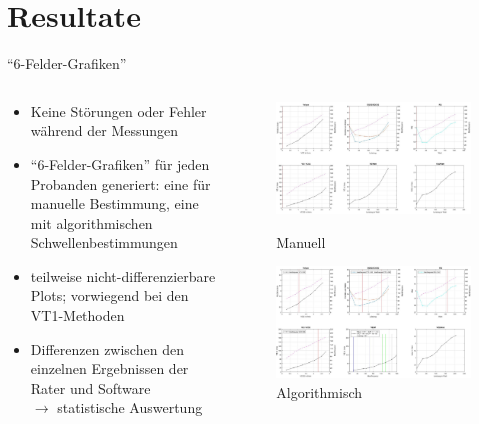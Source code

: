 \documentclass[colorBG,slideColor,8pt]{beamer}
\begin{document}
\section{Resultate}
\begin{frame}
\tableofcontents[currentsection]
\end{frame}

\begin{frame}{"`6-Felder-Grafiken"'}
\begin{columns}
	\begin{column}{0.5\linewidth}
		\begin{itemize}
			\item Keine Störungen oder Fehler während der Messungen
			\item "`6-Felder-Grafiken"' für jeden Probanden generiert: eine für manuelle Bestimmung, eine mit algorithmischen Schwellenbestimmungen
			\item teilweise nicht-differenzierbare Plots; vorwiegend bei den VT1-Methoden
			\item Differenzen zwischen den einzelnen Ergebnissen der Rater und Software\\$\rightarrow$ statistische Auswertung
		\end{itemize}
	\end{column}
	\begin{column}{0.5\linewidth}
		\begin{figure}[H]
			\centering
			\includegraphics[width=0.8\linewidth]{Bilder/plot_6w.jpg}
			\caption{Manuell}
			\includegraphics[width=0.8\linewidth]{Bilder/auto_6.png}
			\caption{Algorithmisch}
		\end{figure}
	\end{column}
\end{columns}
\end{frame}
\end{document}
